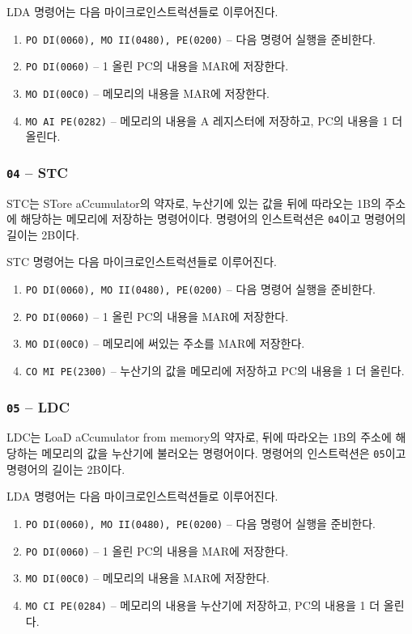 \documentclass{article}
\begin{document}
LDA 명령어는 다음 마이크로인스트럭션들로 이루어진다.

\begin{enumerate}
    \item \texttt{PO DI(0060), MO II(0480), PE(0200)} -- 다음 명령어 실행을 준비한다.
    \item \texttt{PO DI(0060)} -- 1 올린 PC의 내용을 MAR에 저장한다.
    \item \texttt{MO DI(00C0)} -- 메모리의 내용을 MAR에 저장한다.
    \item \texttt{MO AI PE(0282)} -- 메모리의 내용을 A 레지스터에 저장하고,
        PC의 내용을 1 더 올린다.
\end{enumerate}

\subsubsection{\texttt{04} -- STC}

STC는 STore aCcumulator의 약자로, 누산기에 있는 값을
뒤에 따라오는 1B의 주소에 해당하는 메모리에 저장하는 명령어이다.
명령어의 인스트럭션은 \texttt{04}이고 명령어의 길이는 2B이다.

STC 명령어는 다음 마이크로인스트럭션들로 이루어진다.

\begin{enumerate}
    \item \texttt{PO DI(0060), MO II(0480), PE(0200)} -- 다음 명령어 실행을 준비한다.
    \item \texttt{PO DI(0060)} -- 1 올린 PC의 내용을 MAR에 저장한다.
    \item \texttt{MO DI(00C0)} -- 메모리에 써있는 주소를 MAR에 저장한다.
    \item \texttt{CO MI PE(2300)} -- 누산기의 값을 메모리에 저장하고
        PC의 내용을 1 더 올린다.
\end{enumerate}

\subsubsection{\texttt{05} -- LDC}

LDC는 LoaD aCcumulator from memory의 약자로, 뒤에 따라오는 1B의 주소에 해당하는
메모리의 값을 누산기에 불러오는 명령어이다.
명령어의 인스트럭션은 \texttt{05}이고 명령어의 길이는 2B이다.

LDA 명령어는 다음 마이크로인스트럭션들로 이루어진다.

\begin{enumerate}
    \item \texttt{PO DI(0060), MO II(0480), PE(0200)} -- 다음 명령어 실행을 준비한다.
    \item \texttt{PO DI(0060)} -- 1 올린 PC의 내용을 MAR에 저장한다.
    \item \texttt{MO DI(00C0)} -- 메모리의 내용을 MAR에 저장한다.
    \item \texttt{MO CI PE(0284)} -- 메모리의 내용을 누산기에 저장하고,
        PC의 내용을 1 더 올린다.
\end{enumerate}
\end{document}

